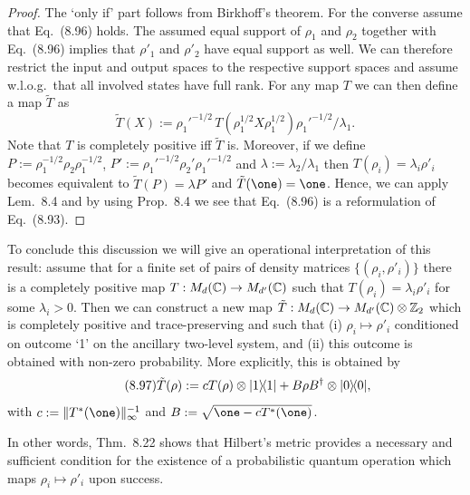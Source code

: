 \documentclass[11pt,a4paper]{article}
\theoremstyle{plain}
\theoremstyle{definition}
\theoremstyle{remark}
\begin{document}
\begin{proof}
    The `only if' part follows from Birkhoff's theorem. For the converse assume that Eq.~(8.96) holds. The assumed equal support of $\rho_1$ and $\rho_2$ together
    with Eq.~(8.96) implies that $\rho'_1$ and $\rho'_2$ have equal support as well. We can therefore restrict the input and output spaces to the respective support spaces
    and assume w.l.o.g.\ that all involved states have full rank. For any map $T$ we can then define a map $\tilde{T}$ as
    \[
        \tilde{T}(X) := \rho_1'^{-1/2}\,T\!(\rho_1^{1/2}X\rho_1^{1/2}) \rho_1'^{-1/2}/\lambda_1.
    \]
    Note that $T$ is completely positive iff $\tilde{T}$ is. Moreover, if we define $P:=\rho_1^{-1/2}\rho_2\rho_1^{-1/2}$,
    $P':=\rho_1'^{-1/2}\rho_2'\rho_1'^{-1/2}$ and $\lambda:=\lambda_2/\lambda_1$ then $T(\rho_i)=\lambda_i\rho'_i$ becomes equivalent to
    $\tilde{T}(P)=\lambda P'$ and $\tilde{T}(\one)=\one$. Hence, we can apply Lem.~8.4 and by using Prop.~8.4 we see that Eq.~(8.96) is a reformulation of Eq.~(8.93).
\end{proof}

To conclude this discussion we will give an operational interpretation of this result: assume that for a finite set of pairs of density matrices $\{(\rho_i,\rho'_i)\}$
there is a completely positive map $T:M_d(\mathbb{C})\to M_{d'}(\mathbb{C})$ such that $T(\rho_i)=\lambda_i\rho'_i$ for some $\lambda_i>0$.
Then we can construct a new map $\tilde{T}:M_d(\mathbb{C})\to M_{d'}(\mathbb{C})\otimes \mathbb{Z}_2$ which is completely positive and trace-preserving and such that
(i) $\rho_i\mapsto \rho'_i$ conditioned on outcome `1' on the ancillary two-level system, and (ii) this outcome is obtained with non-zero probability.
More explicitly, this is obtained by
\begin{equation}\tag{8.97}
    \tilde{T}(\rho) := cT(\rho)\otimes |1\rangle\!\langle1| + B\rho B^\dagger\otimes |0\rangle\!\langle0|,
\end{equation}
with $c:=\|T^\ast(\one)\|_\infty^{-1}$ and $B:=\sqrt{\one-cT^\ast(\one)}$.

In other words, Thm.~8.22 shows that Hilbert's metric provides a necessary and sufficient condition for the existence of a probabilistic quantum operation which maps
$\rho_i\mapsto \rho'_i$ upon success.
\end{document}
